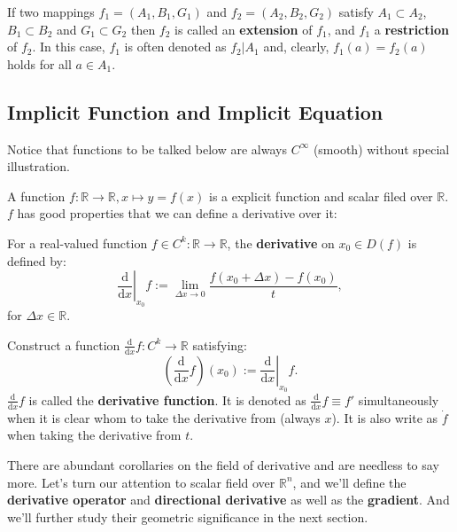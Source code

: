 If two mappings $f_1=(A_1,B_1,G_1)$ and $f_2=(A_2,B_2,G_2)$ satisfy $A_1\subset A_2$, $B_1\subset B_2$ and $G_1\subset G_2$
then $f_2$ is called an \textbf{extension} of $f_1$, and $f_1$ a \textbf{restriction} of $f_2$.
In this case, $f_1$ is often denoted as $f_2|A_1$ and, clearly, $f_1(a)=f_2(a)$ holds for all $a\in A_1$.



\subsection{Implicit Function and Implicit Equation}

\begin{center}
	\begin{tcolorbox}[colback=gray!10,%
					  colframe=black,%
					  width=12cm,%
					  arc=1mm, auto outer arc,
					  boxrule=0.5pt,
					 ]
	Notice that functions to be talked below are always $C^{\infty}$ (smooth) without special illustration.
	\end{tcolorbox}
\end{center}

A function $f: \mathbb{R}\to\mathbb{R}, x\mapsto y=f(x)$ is a explicit function and scalar filed over $\mathbb{R}$.
$f$ has good properties that we can define a derivative over it:

\begin{definition}
	For a real-valued function $f\in C^{k}: \mathbb{R}\to\mathbb{R}$, the \textbf{derivative} on $x_0\in D(f)$ is defined by:
	\[
		\left.\frac{\mathrm{d}}{\mathrm{d}x}\right|_{x_0} f :=
		\lim_{\Delta x\to 0}\frac{f(x_0+\Delta x)-f(x_0)}{t},
	\]
	for $\Delta x\in\mathbb{R}$.
\end{definition}

\begin{definition}
	Construct a function $\frac{\mathrm{d}}{\mathrm{d}x}f: C^{k}\to\mathbb{R}$ satisfying:
	\[
		\left(\frac{\mathrm{d}}{\mathrm{d}x}f\right)(x_0) :=
		\left.\frac{\mathrm{d}}{\mathrm{d}x}\right|_{x_0} f.
	\]
	$\frac{\mathrm{d}}{\mathrm{d}x}f$ is called the \textbf{derivative function}.
	It is denoted as $\frac{\mathrm{d}}{\mathrm{d}x}f\equiv f'$ simultaneously when it is clear whom to take the derivative from (always $x$).
	It is also write as $\dot{f}$ when taking the derivative from $t$.
\end{definition}

There are abundant corollaries on the field of derivative and are needless to say more. Let's turn our attention to
scalar field over $\mathbb{R}^n$, and we'll define the \textbf{derivative operator} and \textbf{directional derivative}
as well as the \textbf{gradient}. And we'll further study their geometric significance in the next section.


